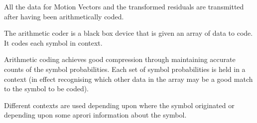 All the data for Motion Vectors and the transformed residuals are
transmitted after having been arithmetically coded.

The arithmetic coder is a black box device that is given an array of
data to code. It codes each symbol in context.

Arithmetic coding achieves good compression through maintaining accurate
counts of the symbol probabilities.  Each set of symbol probabilities is
held in a context (in effect recognising which other data in the array
may be a good match to the symbol to be coded).

Different contexts are used depending upon where the symbol originated
or depending upon some aprori information about the symbol.


